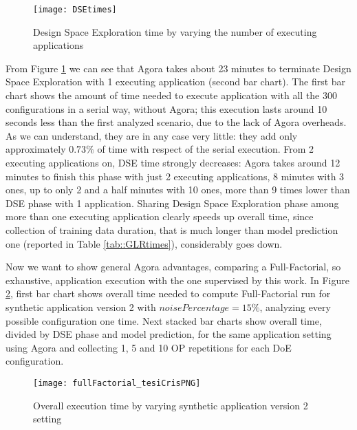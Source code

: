\begin{figure}[htb]

    \centering
    \texttt{[image: DSEtimes]}
    \caption{Design Space Exploration time by varying the number of executing applications}
    \label{fig::DSEtimes}
    
\end{figure}

From Figure \ref{fig::DSEtimes} we can see that Agora takes about 23 minutes to terminate Design Space Exploration with 1 executing application (second bar chart). The first bar chart shows the amount of time needed to execute application with all the 300 configurations in a serial way, without Agora; this execution lasts around 10 seconds less than the first analyzed scenario, due to the lack of Agora overheads. As we can understand, they are in any case very little: they add only approximately $0.73\%$ of time with respect of the serial execution. From 2 executing applications on, DSE time strongly decreases: Agora takes around 12 minutes to finish this phase with just 2 executing applications, 8 minutes with 3 ones, up to only 2 and a half minutes with 10 ones, more than 9 times lower than DSE phase with 1 application. Sharing Design Space Exploration phase among more than one executing application clearly speeds up overall time, since collection of training data duration, that is much longer than model prediction one (reported in Table \ref{tab::GLRtimes}), considerably goes down.

Now we want to show general Agora advantages, comparing a Full-Factorial, so exhaustive, application execution with the one supervised by this work. In Figure \ref{fig::full_cris}, first bar chart shows overall time needed to compute Full-Factorial run for synthetic application version 2 with $noisePercentage = 15\%$, analyzing every possible configuration one time. Next stacked bar charts show overall time, divided by DSE phase and model prediction, for the same application setting using Agora and collecting 1, 5 and 10 OP repetitions for each DoE configuration.

\begin{figure}[htb]

    \centering
    \texttt{[image: fullFactorial\_tesiCrisPNG]}
    \caption{Overall execution time by varying synthetic application version 2 setting}
    \label{fig::full_cris}
    
\end{figure}

